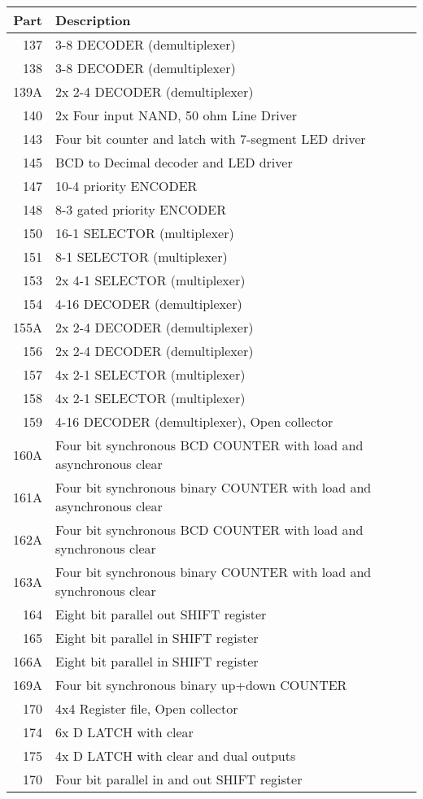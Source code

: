 \begin{tabular}{rl}
Part & Description \\\hline
137 & 3-8 DECODER (demultiplexer)\\
138 & 3-8 DECODER (demultiplexer)\\
139A & 2x 2-4 DECODER (demultiplexer)\\
140 & 2x Four input NAND, 50 ohm Line Driver\\
143 & Four bit counter and latch with 7-segment LED driver\\
145 & BCD to Decimal decoder and LED driver\\
147 & 10-4 priority ENCODER\\
148 & 8-3 gated priority ENCODER\\
150 & 16-1 SELECTOR (multiplexer)\\
151 & 8-1 SELECTOR (multiplexer)\\
153 & 2x 4-1 SELECTOR (multiplexer)\\
154 & 4-16 DECODER (demultiplexer)\\
155A & 2x 2-4 DECODER (demultiplexer)\\
156 & 2x 2-4 DECODER (demultiplexer)\\
157 & 4x 2-1 SELECTOR (multiplexer)\\
158 & 4x 2-1 SELECTOR (multiplexer)\\
159 & 4-16 DECODER (demultiplexer), Open collector\\
160A & Four bit synchronous BCD COUNTER with load and asynchronous clear\\
161A & Four bit synchronous binary COUNTER with load and asynchronous clear\\
162A & Four bit synchronous BCD COUNTER with load and synchronous clear\\
163A & Four bit synchronous binary COUNTER with load and synchronous clear\\
164 & Eight bit parallel out SHIFT register\\
165 & Eight bit parallel in SHIFT register\\
166A & Eight bit parallel in SHIFT register\\
169A & Four bit synchronous binary up+down COUNTER\\
170 & 4x4 Register file, Open collector\\
174 & 6x D LATCH with clear\\
175 & 4x D LATCH with clear and dual outputs\\
170 & Four bit parallel in and out SHIFT register\\

\end{tabular}
